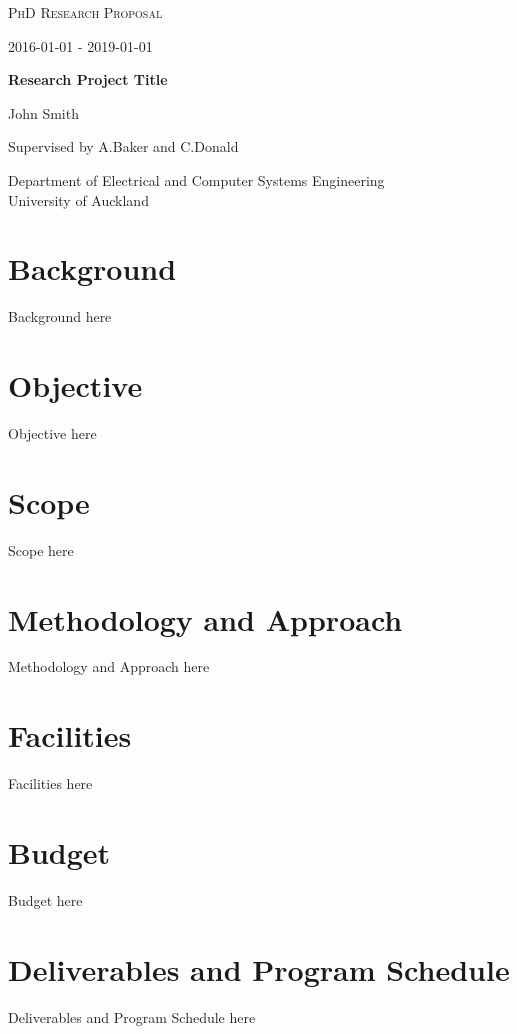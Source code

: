 \documentclass[12pt]{article}
\begin{document}
\begin{titlepage}
    \centering
    {\scshape\LARGE PhD Research Proposal \par}
    {\scshape\Large 2016-01-01 - 2019-01-01 \par} 
    \vfill
    {\huge\bfseries Research Project Title\par} 
    \vfill
    {\Large John Smith\par} 
    \vspace{1cm}
    {\Large Supervised by A.Baker and C.Donald\par} 
    \vfill
    {Department of Electrical and Computer Systems Engineering\\
    University of Auckland} 
\end{titlepage}

\tableofcontents
\newpage


\section{Background}
Background here

\section{Objective}
Objective here

\section{Scope}
Scope here

\section{Methodology and Approach}
Methodology and Approach here

\section{Facilities}
Facilities here

\section{Budget}
Budget here

\section{Deliverables and Program Schedule}
Deliverables and Program Schedule here

\newpage


\end{document}
